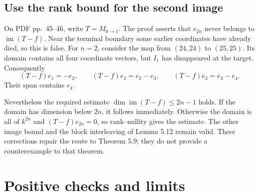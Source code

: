\documentclass[10pt]{article}
\begin{document}
\subsection*{Use the rank bound for the second image}
On PDF pp. 45–46, write \(T=M_{0\to1}\). The proof asserts that \(e_{2n}\) never belongs to \(\operatorname{im}(T-f)\). Near the terminal boundary some earlier coordinates have already died, so this is false. For \(n=2\), consider the map from \((24,24)\) to \((25,25)\). Its domain contains all four coordinate vectors, but \(I_1\) has disappeared at the target. Consequently \[(T-f)e_1=-e_2,\qquad
 (T-f)e_2=e_2-e_3,\qquad
 (T-f)e_3=e_3-e_4.\] Their span contains \(e_4\).\par
Nevertheless the required estimate \(\dim\operatorname{im}(T-f)\leq2n-1\) holds. If the domain has dimension below \(2n\), it follows immediately. Otherwise the domain is all of \(k^{2n}\) and \((T-f)e_{2n}=0\), so rank–nullity gives the estimate. The other image bound and the block interleaving of Lemma 5.12 remain valid. These corrections repair the route to Theorem 5.9; they do not provide a counterexample to that theorem.\par
\section*{Positive checks and limits}
\end{document}
